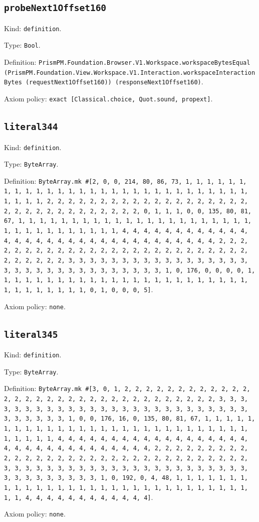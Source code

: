 \documentclass[11pt]{article}
\begin{document}
\subsection*{\texttt{probeNext1Offset160}}
\noindent Kind: \texttt{definition}.\par
\noindent Type: \texttt{Bool}.\par
\noindent Definition: \texttt{PrismPM.Foundation.Browser.V1.Workspace.workspaceBytesEqual (PrismPM.Foundation.View.Workspace.V1.Interaction.workspaceInteractionBytes (requestNext1Offset160)) (responseNext1Offset160)}.\par
\noindent Axiom policy: \texttt{exact [Classical.choice, Quot.sound, propext]}.\par
\subsection*{\texttt{literal344}}
\noindent Kind: \texttt{definition}.\par
\noindent Type: \texttt{ByteArray}.\par
\noindent Definition: \texttt{ByteArray.mk \#[2, 0, 0, 214, 80, 86, 73, 1, 1, 1, 1, 1, 1, 1, 1, 1, 1, 1, 1, 1, 1, 1, 1, 1, 1, 1, 1, 1, 1, 1, 1, 1, 1, 1, 1, 1, 1, 1, 1, 1, 2, 2, 2, 2, 2, 2, 2, 2, 2, 2, 2, 2, 2, 2, 2, 2, 2, 2, 2, 2, 2, 2, 2, 2, 2, 2, 2, 2, 2, 2, 2, 2, 0, 1, 1, 1, 0, 0, 135, 80, 81, 67, 1, 1, 1, 1, 1, 1, 1, 1, 1, 1, 1, 1, 1, 1, 1, 1, 1, 1, 1, 1, 1, 1, 1, 1, 1, 1, 1, 1, 1, 1, 1, 1, 1, 4, 4, 4, 4, 4, 4, 4, 4, 4, 4, 4, 4, 4, 4, 4, 4, 4, 4, 4, 4, 4, 4, 4, 4, 4, 4, 4, 4, 4, 4, 4, 4, 2, 2, 2, 2, 2, 2, 2, 2, 2, 2, 2, 2, 2, 2, 2, 2, 2, 2, 2, 2, 2, 2, 2, 2, 2, 2, 2, 2, 2, 2, 2, 2, 3, 3, 3, 3, 3, 3, 3, 3, 3, 3, 3, 3, 3, 3, 3, 3, 3, 3, 3, 3, 3, 3, 3, 3, 3, 3, 3, 3, 3, 3, 3, 3, 1, 0, 176, 0, 0, 0, 0, 1, 1, 1, 1, 1, 1, 1, 1, 1, 1, 1, 1, 1, 1, 1, 1, 1, 1, 1, 1, 1, 1, 1, 1, 1, 1, 1, 1, 1, 1, 1, 1, 0, 1, 0, 0, 0, 5]}.\par
\noindent Axiom policy: \texttt{none}.\par
\subsection*{\texttt{literal345}}
\noindent Kind: \texttt{definition}.\par
\noindent Type: \texttt{ByteArray}.\par
\noindent Definition: \texttt{ByteArray.mk \#[3, 0, 1, 2, 2, 2, 2, 2, 2, 2, 2, 2, 2, 2, 2, 2, 2, 2, 2, 2, 2, 2, 2, 2, 2, 2, 2, 2, 2, 2, 2, 2, 2, 2, 2, 3, 3, 3, 3, 3, 3, 3, 3, 3, 3, 3, 3, 3, 3, 3, 3, 3, 3, 3, 3, 3, 3, 3, 3, 3, 3, 3, 3, 3, 3, 3, 3, 1, 0, 0, 176, 16, 0, 135, 80, 81, 67, 1, 1, 1, 1, 1, 1, 1, 1, 1, 1, 1, 1, 1, 1, 1, 1, 1, 1, 1, 1, 1, 1, 1, 1, 1, 1, 1, 1, 1, 1, 1, 1, 1, 4, 4, 4, 4, 4, 4, 4, 4, 4, 4, 4, 4, 4, 4, 4, 4, 4, 4, 4, 4, 4, 4, 4, 4, 4, 4, 4, 4, 4, 4, 4, 4, 2, 2, 2, 2, 2, 2, 2, 2, 2, 2, 2, 2, 2, 2, 2, 2, 2, 2, 2, 2, 2, 2, 2, 2, 2, 2, 2, 2, 2, 2, 2, 2, 3, 3, 3, 3, 3, 3, 3, 3, 3, 3, 3, 3, 3, 3, 3, 3, 3, 3, 3, 3, 3, 3, 3, 3, 3, 3, 3, 3, 3, 3, 3, 3, 1, 0, 192, 0, 4, 48, 1, 1, 1, 1, 1, 1, 1, 1, 1, 1, 1, 1, 1, 1, 1, 1, 1, 1, 1, 1, 1, 1, 1, 1, 1, 1, 1, 1, 1, 1, 1, 1, 4, 4, 4, 4, 4, 4, 4, 4, 4, 4, 4, 4]}.\par
\noindent Axiom policy: \texttt{none}.\par
\end{document}
